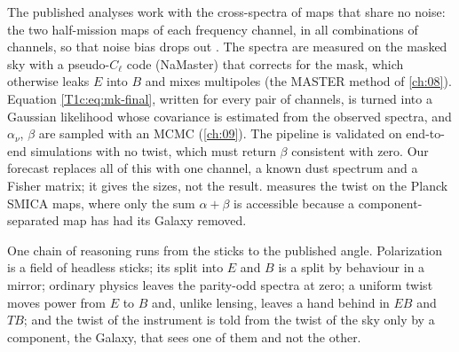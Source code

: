 \begin{inpractice}
The published analyses work with the cross-spectra of maps that share no noise: the two half-mission maps of each frequency channel, in all combinations of channels, so that noise bias drops out \cite{MinamiKomatsu2020}. The spectra are measured on the masked sky with a pseudo-$C_\ell$ code (NaMaster) that corrects for the mask, which otherwise leaks $E$ into $B$ and mixes multipoles (the MASTER method of \cref{ch:08}). Equation \eqref{T1c:eq:mk-final}, written for every pair of channels, is turned into a Gaussian likelihood whose covariance is estimated from the observed spectra, and $\alpha_\nu$, $\beta$ are sampled with an MCMC (\cref{ch:09}). The pipeline is validated on end-to-end simulations with no twist, which must return $\beta$ consistent with zero. Our forecast replaces all of this with one channel, a known dust spectrum and a Fisher matrix; it gives the sizes, not the result.  measures the twist on the Planck SMICA maps, where only the sum $\alpha+\beta$ is accessible because a component-separated map has had its Galaxy removed.
\end{inpractice}

One chain of reasoning runs from the sticks to the published angle. Polarization is a field of headless sticks; its split into $E$ and $B$ is a split by behaviour in a mirror; ordinary physics leaves the parity-odd spectra at zero; a uniform twist moves power from $E$ to $B$ and, unlike lensing, leaves a hand behind in $EB$ and $TB$; and the twist of the instrument is told from the twist of the sky only by a component, the Galaxy, that sees one of them and not the other.

